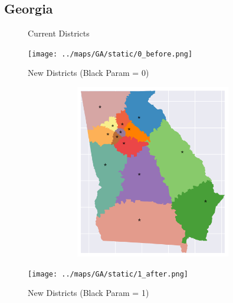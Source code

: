 \subsection{Georgia}
\begin{figure}[htb!] \centering
\caption{ Current Districts }
\texttt{[image: ../maps/GA/static/0\_before.png]}
\caption{ New Districts (Black Param = 0) }
\includegraphics[width=5in,height=3in,keepaspectratio]{../maps/GA/static/0_after.png}
\caption{ New Districts (Black Param = 1) }
\texttt{[image: ../maps/GA/static/1\_after.png]}
\end{figure}

\clearpage
\newpage

